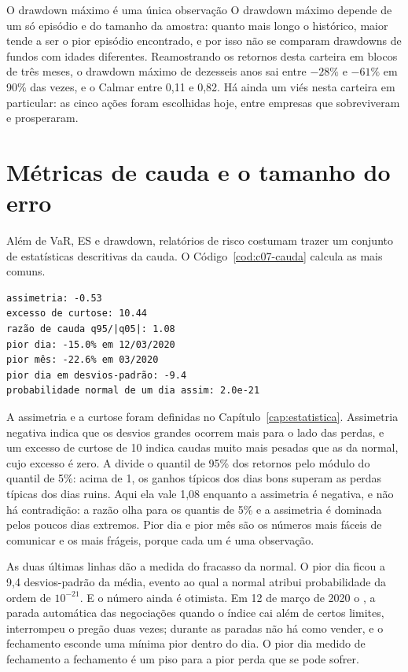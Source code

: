 \begin{armadilha}{O drawdown máximo é uma única observação}
O drawdown máximo depende de um só episódio e do tamanho da amostra: quanto mais longo o histórico, maior tende a ser o pior episódio encontrado, e por isso não se comparam drawdowns de fundos com idades diferentes. Reamostrando os retornos desta carteira em blocos de três meses, o drawdown máximo de dezesseis anos sai entre $-28\%$ e $-61\%$ em 90\% das vezes, e o Calmar entre 0,11 e 0,82. Há ainda um viés nesta carteira em particular: as cinco ações foram escolhidas hoje, entre empresas que sobreviveram e prosperaram.
\end{armadilha}

\section{Métricas de cauda e o tamanho do erro}
\label{sec:c07-cauda}

Além de VaR, ES e drawdown, relatórios de risco costumam trazer um conjunto de estatísticas descritivas da cauda. O Código~\ref{cod:c07-cauda} calcula as mais comuns.


\begin{lstlisting}[style=saida]
assimetria: -0.53
excesso de curtose: 10.44
razão de cauda q95/|q05|: 1.08
pior dia: -15.0% em 12/03/2020
pior mês: -22.6% em 03/2020
pior dia em desvios-padrão: -9.4
probabilidade normal de um dia assim: 2.0e-21
\end{lstlisting}

A assimetria e a curtose foram definidas no Capítulo~\ref{cap:estatistica}. Assimetria negativa indica que os desvios grandes ocorrem mais para o lado das perdas, e um excesso de curtose de 10 indica caudas muito mais pesadas que as da normal, cujo excesso é zero. A  divide o quantil de 95\% dos retornos pelo módulo do quantil de 5\%: acima de 1, os ganhos típicos dos dias bons superam as perdas típicas dos dias ruins. Aqui ela vale 1,08 enquanto a assimetria é negativa, e não há contradição: a razão olha para os quantis de 5\% e a assimetria é dominada pelos poucos dias extremos. Pior dia e pior mês são os números mais fáceis de comunicar e os mais frágeis, porque cada um é uma observação.

As duas últimas linhas dão a medida do fracasso da normal. O pior dia ficou a 9,4 desvios-padrão da média, evento ao qual a normal atribui probabilidade da ordem de $10^{-21}$. E o número ainda é otimista. Em 12 de março de 2020 o , a parada automática das negociações quando o índice cai além de certos limites, interrompeu o pregão duas vezes; durante as paradas não há como vender, e o fechamento esconde uma mínima pior dentro do dia. O pior dia medido de fechamento a fechamento é um piso para a pior perda que se pode sofrer.

